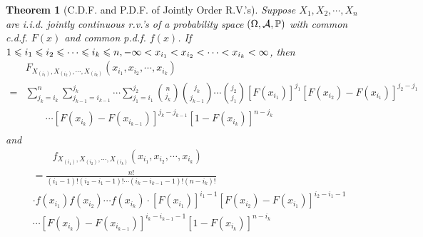 \documentclass[openany,12pt]{book}
\newtheorem{theorem}{Theorem}[chapter]
\begin{document}
\begin{theorem}[C.D.F. and P.D.F. of Jointly Order R.V.'s]
  Suppose $X_{1}, X_{2}, \cdots,X_{n}$ are i.i.d. jointly continuous r.v.'s of a probability space $(\Omega,\mathcal{A},\mathbb{P})$ with common c.d.f. $F(x)$ and common p.d.f. $f(x)$. If
  $1 \leqslant i_{1} \leqslant i_{2} \leqslant \cdots \leqslant i_{k} \leqslant n,  - \infty < x_{i_{1}} < x_{i_{2}} < \cdots < x_{i_{k}} < \infty$, then
  \[\begin{aligned}
        & F_{X_{\left(i_{1}\right)},X_{\left(i_{2}\right)}, \cdots,X_{\left(i_{k}\right)}}\left( x_{i_{1}},x_{i_{2}}, \cdots, x_{i_{k}} \right)                                                                                                                                                                      \\
      = & \sum_{j_{k} = i_{k}}^{n}{\sum_{j_{k - 1} = i_{k - 1}}^{j_{k}}\cdots}\sum_{j_{1} = i_{1}}^{j_{2}} \binom{n}{j_{k}}\binom{j_{k}}{j_{k - 1}} \cdots \binom{j_{2}}{j_{1}}\left[ F\left( x_{i_{1}} \right) \right]^{j_{1}} \left[ F\left( x_{i_{2}} \right) - F\left( x_{i_{1}} \right) \right]^{j_{2} - j_{1}} \\
        & \qquad\cdots \left[ F\left( x_{i_{k}} \right) - F\left( x_{i_{k - 1}} \right) \right]^{j_{k} - j_{k - 1}} \left[ 1 - F\left( x_{i_{k}} \right) \right]^{n - j_{k}}                                                                                                                                         \\
    \end{aligned}\]
  and
  \[\begin{aligned}
       & \qquad f_{X_{\left(i_{1}\right)},X_{\left(i_{2}\right)}, \cdots,X_{\left(i_{k}\right)}}\left( x_{i_{1}},x_{i_{2}}, \cdots, x_{i_{k}} \right)                                                                                               \\
       & = \frac{n!}{\left( i_{1} - 1 \right)!\left( i_{2} - i_{1} - 1 \right)!\cdots\left( i_{k} - i_{k - 1} - 1 \right)!\left( n - i_{k} \right)!}                                                                                                \\
       & \cdot f\left( x_{i_{1}} \right)f\left( x_{i_{2}} \right)\cdots f\left( x_{i_{k}} \right)\cdot \left[ F\left( x_{i_{1}} \right) \right]^{i_{1} - 1}\left[ F\left( x_{i_{2}} \right) - F\left( x_{i_{1}} \right) \right]^{i_{2} - i_{1} - 1} \\
       & \cdots \left[ F\left( x_{i_{k}} \right) - F\left( x_{i_{k - 1}} \right) \right]^{i_{k} - i_{k - 1} - 1} \left[ 1 - F\left( x_{i_{k}} \right) \right]^{n - i_{k}}                                                                           \\
    \end{aligned}\]
\end{theorem}
\end{document}
